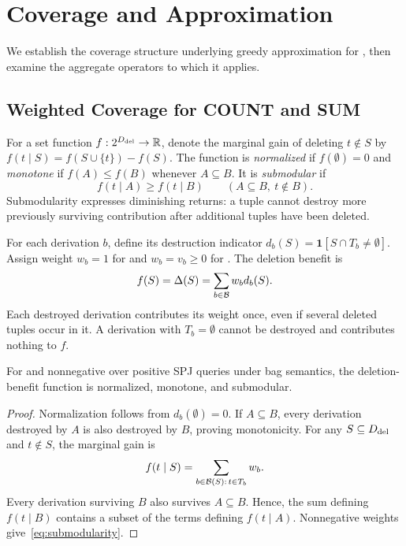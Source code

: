 \section{Coverage and Approximation}
\label{sec:theory}
\label{sec:aggregate-submodularity}

We establish the coverage structure underlying greedy approximation
for \MIW, then examine the aggregate operators to which it applies.

\subsection{Weighted Coverage for COUNT and SUM}
\label{sec:submod-count-sum}

For a set function $f:2^{D_{\mathrm{del}}}\to\mathbb{R}$, denote the marginal gain of
deleting $t\notin S$ by $f(t\mid S)=f(S\cup\{t\})-f(S)$.
The function is \emph{normalized} if $f(\emptyset)=0$ and \emph{monotone}
if $f(A)\le f(B)$ whenever $A\subseteq B$. It is \emph{submodular} if
\begin{equation}
\label{eq:submodularity}
f(t\mid A)\ge f(t\mid B)
\qquad(A\subseteq B,\ t\notin B).
\end{equation}
Submodularity expresses diminishing returns: a tuple cannot destroy more
previously surviving contribution after additional tuples have been deleted.

For each derivation $b$, define its destruction indicator
$d_b(S)=\mathbf{1}[S\cap T_b\ne\emptyset]$. Assign weight $w_b=1$ for
 and $w_b=v_b\ge0$ for . The deletion benefit is
\begin{equation}
\label{eq:weighted-coverage}
f(S)=\Delta(S)=\sum_{b\in\mathcal{B}}w_b d_b(S).
\end{equation}
Each destroyed derivation contributes its weight once, even if several
deleted tuples occur in it. A derivation with $T_b=\emptyset$ cannot be
destroyed and contributes nothing to $f$.

\begin{theorem}
\label{thm:weighted-coverage}
For  and nonnegative  over positive SPJ queries
under bag semantics, the deletion-benefit function is normalized,
monotone, and submodular.
\end{theorem}
\begin{proof}
Normalization follows from $d_b(\emptyset)=0$. If $A\subseteq B$, every
derivation destroyed by $A$ is also destroyed by $B$, proving monotonicity.
For any $S\subseteq D_{\mathrm{del}}$ and $t\notin S$, the marginal gain is
\begin{equation}
\label{eq:coverage-marginal}
f(t\mid S)=\sum_{b\in\mathcal{B}(S):\,t\in T_b}w_b.
\end{equation}
Every derivation surviving $B$ also survives $A\subseteq B$. Hence, the
sum defining $f(t\mid B)$ contains a subset of the terms defining
$f(t\mid A)$. Nonnegative weights give~\eqref{eq:submodularity}.
\end{proof}

